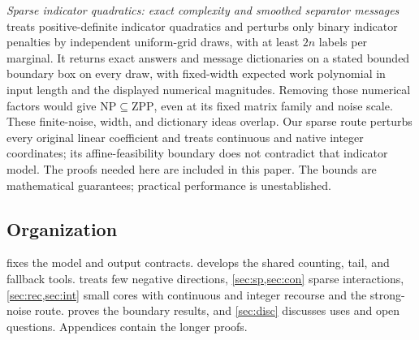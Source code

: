 \emph{Sparse indicator quadratics: exact complexity and smoothed separator
messages}~\citep{companion-sparse-indicator} treats positive-definite
indicator quadratics and perturbs only binary indicator penalties by
independent uniform-grid draws, with at least $2n$ labels per marginal. It
returns exact answers and message dictionaries on a stated bounded boundary
box on every draw, with fixed-width expected work polynomial in input length
and the displayed numerical magnitudes. Removing those numerical factors
would give $\mathrm{NP}\subseteq\mathrm{ZPP}$, even at its fixed matrix
family and noise scale. These finite-noise, width, and dictionary ideas
overlap. Our sparse route perturbs every original
linear coefficient and treats continuous and native integer coordinates;
its affine-feasibility boundary does not contradict that indicator model.
The proofs needed here are included in this paper. The bounds are
mathematical guarantees; practical performance is unestablished.

\subsection{Organization}\label{sec:intro:organization}

 fixes the model and output contracts. 
develops the shared counting, tail, and fallback tools.  treats
few negative directions, \cref{sec:sp,sec:con} sparse interactions,
\cref{sec:rec,sec:int} small cores with continuous and integer recourse and
the strong-noise route.  proves the boundary results, and
\cref{sec:disc} discusses uses and open questions. Appendices contain the
longer proofs.
